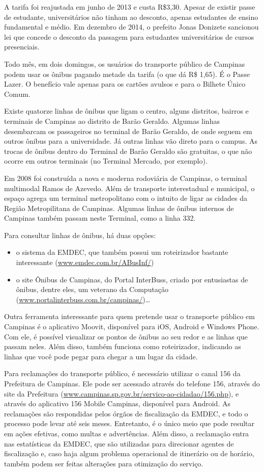 A tarifa foi reajustada em junho de 2013 e custa R\$3,30. Apesar de existir
passe de estudante, universitários não tinham ao desconto, apenas estudantes de
ensino fundamental e médio. Em dezembro de 2014, o prefeito Jonas Donizete
sancionou lei que concede o desconto da passagem para estudantes universitários
de cursos presenciais.

Todo mês, em dois domingos, os usuários do transporte público de Campinas podem
usar os ônibus pagando metade da tarifa (o que dá R\$ 1,65). É o Passe Lazer. O
benefício vale apenas para os cartões avulsos e para o Bilhete Único Comum.

Existe quatorze linhas de ônibus que ligam o centro, alguns distritos, bairros e
terminais de Campinas ao distrito de Barão Geraldo. Algumas linhas desembarcam
os passageiros no terminal de Barão Geraldo, de onde seguem em outros ônibus
para a universidade. Já outras linhas vão direto para o campus. As trocas de
ônibus dentro do Terminal de Barão Geraldo são gratuitas, o que não ocorre em
outros terminais (no Terminal Mercado, por exemplo).

Em 2008 foi construída a nova e moderna rodoviária de Campinas, o terminal
multimodal Ramos de Azevedo. Além de transporte interestadual e municipal, o
espaço agrega um terminal metropolitano com o intuito de ligar as cidades da
Região Metropilitana de Campinas. Algumas linhas de ônibus internos de Campinas
também passam neste Terminal, como a linha 332.

Para consultar linhas de ônibus, há duas opções:
\begin{itemize}
  \item o sistema da EMDEC, que também possui um roteirizador bastante
interessante (\url{www.emdec.com.br/ABusInf/})
  \item o site Ônibus de Campinas, do Portal InterBuss, criado por entusiastas
de ônibus, dentre eles, um veterano da Computação
(\url{www.portalinterbuss.com.br/campinas/})\ldots
\end{itemize}

Outra ferramenta interessante para quem pretende usar o transporte público em
Campinas é o aplicativo Moovit, disponível para iOS, Android e Windows
Phone. Com ele, é possível visualizar os pontos de ônibus ao seu redor e as
linhas que passam neles. Além disso, também funciona como roteirizador,
indicando as linhas que você pode pegar para chegar a um lugar da cidade.

Para reclamações do transporte público, é necessário utilizar o canal 156 da
Prefeitura de Campinas. Ele pode ser acessado através do telefone 156, através
do site da Prefeitura (\url{www.campinas.sp.gov.br/servico-ao-cidadao/156.php}),
e através do aplicativo 156 Mobile Campinas, disponível para Android. As
reclamações são respondidas pelos órgãos de fiscalização da EMDEC, e todo o
processo pode levar até seis meses. Entretanto, é o único meio que pode resultar
em ações efetivas, como multas e advertências. Além disso, a reclamação entra
nas estatísticas da EMDEC, que são utilizadas para direcionar agentes de
fiscalização e, caso haja algum problema operacional de itinerário ou de
horário, também podem ser feitas alterações para otimização do serviço.

